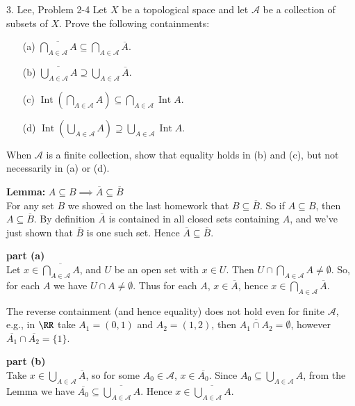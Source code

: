 \documentclass{homework}
\newcommand{\calA}{\mathcal{A}}
\DeclareMathOperator{\Int}{\mathrm{Int}}
\begin{document}
\begin{exercise}{3. Lee, Problem 2-4}
Let $X$ be a topological space and let $\calA$ be a collection of subsets
of $X$.  Prove the following containments:
\vspace{-.1in}
\begin{multicols}{2}
\begin{itemize}
\item[(a)] $\displaystyle\overline{\bigcap_{A\in\calA} A} \subseteq \bigcap_{A\in\calA} \overline{A}$.
\item[(b)] $\displaystyle\overline{\bigcup_{A\in\calA} A} \supseteq \bigcup_{A\in\calA} \overline{A}$.
\item[(c)] $\displaystyle\Int\left(\bigcap_{A\in\calA} A\right) \subseteq \bigcap_{A\in\calA}\Int A$.
\item[(d)] $\displaystyle\Int\left(\bigcup_{A\in\calA} A\right) \supseteq \bigcup_{A\in\calA}\Int A$.
\end{itemize}
\end{multicols}
\vspace{-.1in}
When $\calA$ is a finite collection, show that equality holds in (b) and (c), but
not necessarily in (a) or (d).
\end{exercise}
\vspace{-.2in}
\solution
\textbf{Lemma:} \textit{$A\subseteq B\implies\overline{A}\subseteq\overline{B}$}\\
For any set $B$ we showed on the last homework that $B\subseteq\overline{B}$. So
if $A\subseteq B$, then $A\subseteq\overline{B}$.  By definition $\overline{A}$ is
contained in all closed sets containing $A$, and we've just shown that $\overline{B}$
is one such set.  Hence $\overline{A}\subseteq\overline{B}$.

\textbf{part (a)}\\
Let $x\in \overline{\bigcap_{A\in\calA} A}$, and $U$ be an open set with $x\in U$.
Then $U\cap \bigcap_{A\in\calA} A\ne\emptyset$.  So, for each $A$ we have
$U\cap A\ne\emptyset$.  Thus for each $A$, $x\in\overline{A}$, hence
$x\in\bigcap_{A\in\calA}\overline{A}$.

The reverse containment (and hence equality) does not hold even for finite $\calA$, e.g.,
in $\RR$ take $A_1=(0,1)$ and $A_2=(1,2)$, then
$\overline{A_1\cap A_2}=\emptyset$, however $\overline{A_1}\cap\overline{A_2}=\{1\}$.

\textbf{part (b)}\\
Take $x\in\bigcup_{A\in\calA} \overline{A}$, so
for some $A_0\in\calA$, $x\in\overline{A_0}$.
Since $A_0\subseteq \bigcup_{A\in\calA} A$, from the Lemma we have
$\overline{A_0}\subseteq \overline{\bigcup_{A\in\calA} A}$.  Hence
$x\in\overline{\bigcup_{A\in\calA} A}$.
\end{document}
